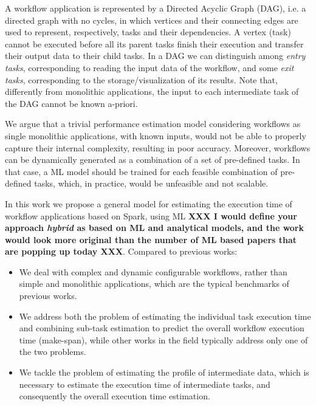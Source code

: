 \documentclass[a4paper, 10pt, conference]{ieeeconf}      %
\begin{document}
\color{black}




A workflow application is  represented by a Directed Acyclic Graph (DAG), i.e. a directed graph with no cycles, in which vertices and their connecting edges are used to represent, respectively,  tasks and their dependencies. A vertex (task) cannot be executed before all its parent tasks finish their execution and transfer their output data to their child tasks.
In a DAG we can distinguish among \textit{entry tasks}, corresponding to reading the input data of the workflow, and some \textit{exit tasks}, corresponding to the storage/visualization of its results.
Note that, differently from monolithic applications,  the input to each intermediate task of the DAG cannot be known a-priori.

We argue that a trivial performance estimation model considering workflows as single monolithic applications, with known inputs, would not be able to properly capture their internal complexity, resulting in poor accuracy.
Moreover, workflows can be dynamically generated as a combination of a set of pre-defined tasks. In that case, a ML model should be trained for each feasible combination of pre-defined tasks, which, in practice, would be unfeasible and not scalable.

In this work we propose a general model for estimating the execution time of workflow applications based on Spark, using ML \textbf{XXX I would define your approach  \textit{hybrid} as based on ML and analytical models, and the work would look more original than the number of ML based papers that are popping up today XXX}. Compared to previous works:
\begin{itemize}
    \item  We deal with complex and dynamic configurable workflows, rather than simple and monolithic applications, which are the typical benchmarks of previous works.
    \item We address both the problem of estimating the individual task execution time and combining sub-task estimation to predict the overall workflow execution time (make-span), while other works in the field typically address only one of the two problems.
    \item We tackle the problem of estimating the profile of intermediate data, which is necessary to estimate the execution time of intermediate tasks, and consequently the overall execution time estimation.
\end{itemize}
\end{document}
